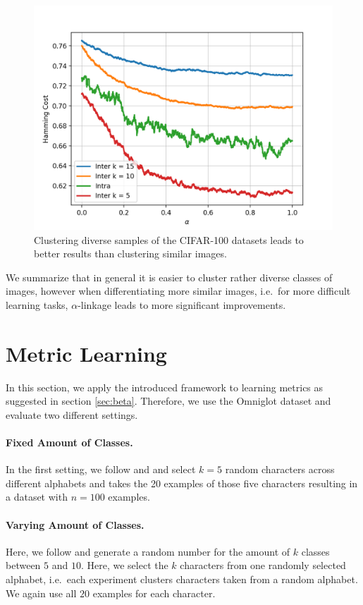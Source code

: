 \begin{figure}[H]
  \centering
  \includegraphics[width=.6\textwidth]{plots/cifar100}
  \caption{Clustering diverse samples of the CIFAR-100 datasets leads to better results than clustering similar images.}
  \label{fig:cifar100}
\end{figure}

We summarize that in general it is easier to cluster rather diverse classes of images, however when differentiating more similar images, i.e.\ for more difficult learning tasks, $\alpha$-linkage leads to more significant improvements.

\section{Metric Learning}
\label{sec:metric}

In this section, we apply the introduced framework to learning metrics as suggested in section \ref{sec:beta}. Therefore, we use the Omniglot dataset and evaluate two different settings.

\paragraph{Fixed Amount of Classes.} In the first setting, we follow \cite{NIPS2016_6385} and \cite{pmlr-v70-finn17a} and select $k = 5$ random characters across different alphabets and takes the 20 examples of those five characters resulting in a dataset with $n = 100$ examples.

\paragraph{Varying Amount of Classes.} Here, we follow \cite{DBLP:journals/corr/abs-1903-03096} and generate a random number for the amount of $k$ classes between $5$ and $10$. Here, we select the $k$ characters from one randomly selected alphabet, i.e.\ each experiment clusters characters taken from a random alphabet. We again use all $20$ examples for each character.


